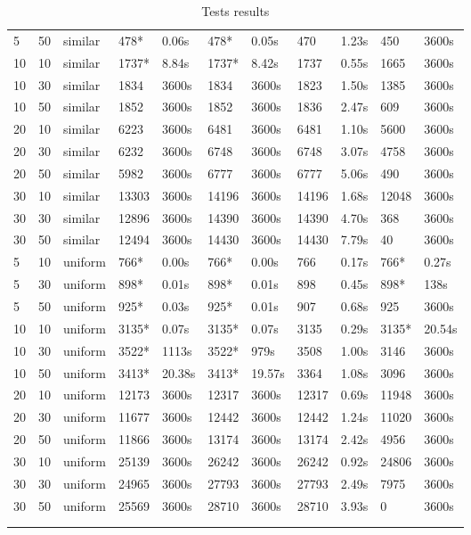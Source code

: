 \begin{scriptsize}
\begin{longtable}{@{\extracolsep{\fill}}lllllllllll@{}}
 5 & 50 & similar& 478*& 0.06s& 478*& 0.05s & 470& 1.23s & 450& 3600s\\
 10 & 10 & similar& 1737*& 8.84s& 1737*& 8.42s & 1737& 0.55s & 1665& 3600s\\
 10 & 30 & similar& 1834& 3600s& 1834& 3600s& 1823& 1.50s & 1385& 3600s\\
 10 & 50 & similar& 1852& 3600s& 1852& 3600s& 1836& 2.47s & 609& 3600s\\
 20 & 10 & similar& 6223& 3600s& 6481& 3600s& 6481& 1.10s & 5600& 3600s\\
 20 & 30 & similar& 6232& 3600s& 6748& 3600s& 6748& 3.07s & 4758& 3600s\\
 20 & 50 & similar& 5982& 3600s& 6777& 3600s& 6777& 5.06s & 490& 3600s\\
 30 & 10 & similar& 13303& 3600s& 14196& 3600s& 14196& 1.68s & 12048& 3600s\\
 30 & 30 & similar& 12896& 3600s& 14390& 3600s& 14390& 4.70s & 368& 3600s\\
 30 & 50 & similar& 12494& 3600s& 14430& 3600s& 14430& 7.79s & 40& 3600s\\
 5 & 10 & uniform& 766*& 0.00s& 766*& 0.00s & 766& 0.17s & 766*& 0.27s \\
 5 & 30 & uniform& 898*& 0.01s& 898*& 0.01s & 898& 0.45s & 898*& 138s \\
 5 & 50 & uniform& 925*& 0.03s& 925*& 0.01s & 907& 0.68s & 925& 3600s\\
 10 & 10 & uniform& 3135*& 0.07s& 3135*& 0.07s & 3135& 0.29s & 3135*& 20.54s \\
 10 & 30 & uniform& 3522*& 1113s & 3522*& 979s & 3508& 1.00s & 3146& 3600s\\
 10 & 50 & uniform& 3413*& 20.38s& 3413*& 19.57s & 3364& 1.08s & 3096& 3600s\\
 20 & 10 & uniform& 12173& 3600s& 12317& 3600s& 12317& 0.69s & 11948& 3600s\\
 20 & 30 & uniform& 11677& 3600s& 12442& 3600s& 12442& 1.24s & 11020& 3600s\\
 20 & 50 & uniform& 11866& 3600s& 13174& 3600s& 13174& 2.42s & 4956& 3600s\\
 30 & 10 & uniform& 25139& 3600s& 26242& 3600s& 26242& 0.92s & 24806& 3600s\\
 30 & 30 & uniform& 24965& 3600s& 27793& 3600s& 27793& 2.49s & 7975& 3600s\\
 30 & 50 & uniform& 25569& 3600s& 28710& 3600s& 28710& 3.93s & 0& 3600s\\
\hline\\ 
\caption{Tests results}\\ 
\end{longtable}
\end{scriptsize}
